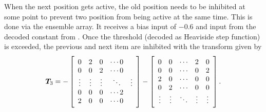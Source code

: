 When the next position gets active, the old position needs to be inhibited at some point to prevent two position from being active at the same time.
This is done via the  ensemble array.
It receives a bias input of \num{-0.6} and input from the decoded constant from .
Once the threshold (decoded as Heaviside step function) is exceeded, the previous and next item are inhibited with the transform given by
\begin{equation}
    \mat T_3 = -\sbr{\begin{array}{ccccc}
            0 & 2 & 0 & \cdots 0 \\
            0 & 0 & 2 & \cdots 0 \\
            \vdots & \vdots & \vdots & \ddots & \vdots \\
            0 & 0 & 0 & \cdots 2 \\
            2 & 0 & 0 & \cdots 0
    \end{array}} - \sbr{\begin{array}{ccccc}
        0 & 0 & \cdots & 2 & 0 \\
        0 & 0 & \cdots & 0 & 2 \\
        2 & 0 & \cdots & 0 & 0 \\
        0 & 2 & \cdots & 0 & 0 \\
        \vdots & \vdots & \ddots & \vdots & \vdots
    \end{array}} \text{.}
\end{equation}
